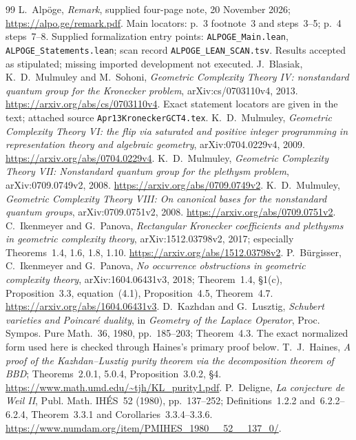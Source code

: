 \begin{thebibliography}{99}
 L.~Alp\"oge, \emph{Remark}, supplied four-page note, 20 November 2026; \url{https://alpo.ge/remark.pdf}. Main locators: p.~3 footnote~3 and steps~3--5; p.~4 steps~7--8. Supplied formalization entry points: \texttt{ALPOGE\_Main.lean}, \texttt{ALPOGE\_Statements.lean}; scan record \texttt{ALPOGE\_LEAN\_SCAN.tsv}. Results accepted as stipulated; missing imported development not executed.
 J.~Blasiak, K.~D.~Mulmuley and M.~Sohoni, \emph{Geometric Complexity Theory IV: nonstandard quantum group for the Kronecker problem}, arXiv:cs/0703110v4, 2013. \url{https://arxiv.org/abs/cs/0703110v4}. Exact statement locators are given in the text; attached source \texttt{Apr13KroneckerGCT4.tex}.
 K.~D.~Mulmuley, \emph{Geometric Complexity Theory VI: the flip via saturated and positive integer programming in representation theory and algebraic geometry}, arXiv:0704.0229v4, 2009. \url{https://arxiv.org/abs/0704.0229v4}.
 K.~D.~Mulmuley, \emph{Geometric Complexity Theory VII: Nonstandard quantum group for the plethysm problem}, arXiv:0709.0749v2, 2008. \url{https://arxiv.org/abs/0709.0749v2}.
 K.~D.~Mulmuley, \emph{Geometric Complexity Theory VIII: On canonical bases for the nonstandard quantum groups}, arXiv:0709.0751v2, 2008. \url{https://arxiv.org/abs/0709.0751v2}.
 C.~Ikenmeyer and G.~Panova, \emph{Rectangular Kronecker coefficients and plethysms in geometric complexity theory}, arXiv:1512.03798v2, 2017; especially Theorems~1.4, 1.6, 1.8, 1.10. \url{https://arxiv.org/abs/1512.03798v2}.
 P.~B\"urgisser, C.~Ikenmeyer and G.~Panova, \emph{No occurrence obstructions in geometric complexity theory}, arXiv:1604.06431v3, 2018; Theorem~1.4, \S1(c), Proposition~3.3, equation~(4.1), Proposition~4.5, Theorem~4.7. \url{https://arxiv.org/abs/1604.06431v3}.
 D.~Kazhdan and G.~Lusztig, \emph{Schubert varieties and Poincar\'e duality}, in \emph{Geometry of the Laplace Operator}, Proc. Sympos. Pure Math.~36, 1980, pp.~185--203; Theorem~4.3. The exact normalized form used here is checked through Haines's primary proof below.
 T.~J.~Haines, \emph{A proof of the Kazhdan--Lusztig purity theorem via the decomposition theorem of BBD}; Theorems~2.0.1, 5.0.4, Proposition~3.0.2, \S4. \url{https://www.math.umd.edu/~tjh/KL_purity1.pdf}.
 P.~Deligne, \emph{La conjecture de Weil II}, Publ. Math. IH\'ES~52 (1980), pp.~137--252; Definitions~1.2.2 and~6.2.2--6.2.4, Theorem~3.3.1 and Corollaries~3.3.4--3.3.6. \url{https://www.numdam.org/item/PMIHES_1980__52__137_0/}.

\end{thebibliography}
